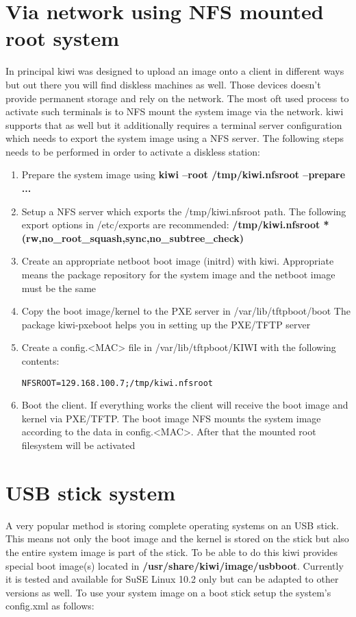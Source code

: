 \section{Via network using NFS mounted root system}
In principal kiwi was designed to upload an image onto a client in different
ways but out there you will find diskless machines as well. Those devices
doesn't provide permanent storage and rely on the network. The most oft used
process to activate such terminals is to NFS mount the system image via
the network. kiwi supports that as well but it additionally requires a
terminal server configuration which needs to export the system image using
a NFS server. The following steps needs to be performed in order to activate
a diskless station:
\begin{enumerate}
\item Prepare the system image using \textbf{kiwi --root /tmp/kiwi.nfsroot --prepare ...}
\item Setup a NFS server which exports the /tmp/kiwi.nfsroot path. The
      following export options in /etc/exports are recommended:
      \textbf{/tmp/kiwi.nfsroot  *(rw,no\_root\_squash,sync,no\_subtree\_check)}
\item Create an appropriate netboot boot image (initrd) with kiwi. Appropriate
      means the package repository for the system image and the netboot image
	  must be the same
\item Copy the boot image/kernel to the PXE server in /var/lib/tftpboot/boot
      The package kiwi-pxeboot helps you in setting up the PXE/TFTP server
\item Create a config.<MAC> file in /var/lib/tftpboot/KIWI with the following
      contents:
\begin{verbatim}
NFSROOT=129.168.100.7;/tmp/kiwi.nfsroot
\end{verbatim} 
\item Boot the client. If everything works the client will receive the boot
      image and kernel via PXE/TFTP. The boot image NFS mounts the system image
      according to the data in config.<MAC>. After that the mounted root filesystem
      will be activated  
\end{enumerate}

\section{USB stick system}
A very popular method is storing complete operating systems on an USB
stick. This means not only the boot image and the kernel is stored on
the stick but also the entire system image is part of the stick.
To be able to do this kiwi provides special boot image(s) located in
\textbf{/usr/share/kiwi/image/usbboot}. Currently it is tested and available
for SuSE Linux 10.2 only but can be adapted to other versions as well.
To use your system image on a boot stick setup the system's config.xml
as follows:

